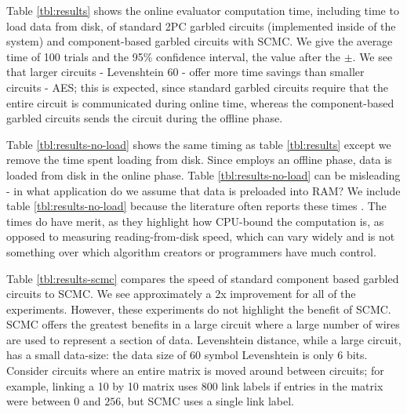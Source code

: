 Table \ref{tbl:results} shows the online evaluator computation time, including time to load data from disk, of standard 2PC garbled circuits (implemented inside of the \CompGC system) and component-based garbled circuits with SCMC.
We give the average time of 100 trials and the 95\% confidence interval, the value after the $\pm$.
We see that larger circuits - Levenshtein 60 - offer more time savings than smaller circuits - AES; this is expected, since standard garbled circuits require that the entire circuit is communicated during online time, whereas the component-based garbled circuits sends the circuit during the offline phase. 

Table \ref{tbl:results-no-load} shows the same timing as table \ref{tbl:results} except we remove the time spent loading from disk.
Since \CompGC employs an offline phase, data is loaded from disk in the online phase. 
Table \ref{tbl:results-no-load} can be misleading - in what application do we assume that data is preloaded into RAM?
We include table \ref{tbl:results-no-load} because the literature often reports these times \cite{blazing-fast}. 
The times do have merit, as they highlight how CPU-bound the computation is, as opposed to measuring reading-from-disk speed, which can vary widely and is not something over which algorithm creators or programmers have much control. 

Table \ref{tbl:results-scmc} compares the speed of standard component based garbled circuits to SCMC.
We see approximately a 2x improvement for all of the experiments. 
However, these experiments do not highlight the benefit of SCMC. 
SCMC offers the greatest benefits in a large circuit where a large number of wires are used to represent a section of data.
Levenshtein distance, while a large circuit, has a small data-size: the data size of 60 symbol Levenshtein is only 6 bits. 
Consider circuits where an entire matrix is moved around between circuits; for example, linking a 10 by 10 matrix uses $800$ link labels if entries in the matrix were between $0$ and $256$, but SCMC uses a single link label.

\newpage



\newpage


